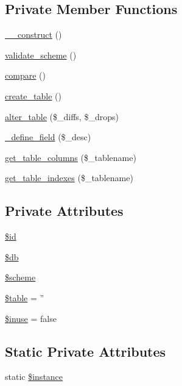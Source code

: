 \subsection*{Private Member Functions}
\begin{DoxyCompactItemize}
\item 
\hyperlink{classSchemeHandler_ae528fde31fe73647c614ef6f957c4caf}{\_\-\_\-construct} ()
\item 
\hyperlink{classSchemeHandler_a1d92dea6ea4643959609959bdce6f0d1}{validate\_\-scheme} ()
\item 
\hyperlink{classSchemeHandler_ae2a981feae465ef5e46782b4a18da1ad}{compare} ()
\item 
\hyperlink{classSchemeHandler_a87f623cc6ac1e44576d2415e36804218}{create\_\-table} ()
\item 
\hyperlink{classSchemeHandler_a7652ae28d0407f5be24fd67ad1b79e8d}{alter\_\-table} (\$\_\-diffs, \$\_\-drops)
\item 
\hyperlink{classSchemeHandler_a223d509509598fbc99741e910bda8cac}{\_\-define\_\-field} (\$\_\-desc)
\item 
\hyperlink{classSchemeHandler_ab8f222514c3aa614190201a6a8a9cedd}{get\_\-table\_\-columns} (\$\_\-tablename)
\item 
\hyperlink{classSchemeHandler_a23070e6253bcd9b0bc343bc582219638}{get\_\-table\_\-indexes} (\$\_\-tablename)
\end{DoxyCompactItemize}
\subsection*{Private Attributes}
\begin{DoxyCompactItemize}
\item 
\hyperlink{classSchemeHandler_af297e966eae06ff1e38a143f93b4aeb9}{\$id}
\item 
\hyperlink{classSchemeHandler_abf3bf26e35b759ccd49f358dedc2dfd1}{\$db}
\item 
\hyperlink{classSchemeHandler_aeb6dfa54ebd11b0d6acc51b8244d598c}{\$scheme}
\item 
\hyperlink{classSchemeHandler_aea92c0f74dbb2e1efd07bdb472660e20}{\$table} = ''
\item 
\hyperlink{classSchemeHandler_a90e5b04603f86c04b1691b2ddf730104}{\$inuse} = false
\end{DoxyCompactItemize}
\subsection*{Static Private Attributes}
\begin{DoxyCompactItemize}
\item 
static \hyperlink{classSchemeHandler_a6f45c52527230b3f3b60d75a9b55e3c1}{\$instance}
\end{DoxyCompactItemize}


